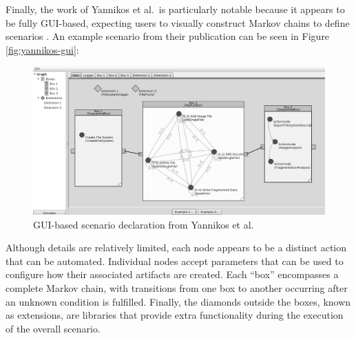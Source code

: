 \documentclass[letterpaper,12pt]{report}
\begin{document}
Finally, the work of Yannikos et al.~is particularly notable because it
appears to be fully GUI-based, expecting users to visually construct
Markov chains to define scenarios
\cite{yannikosDataCorporaDigital2014}. An example scenario from
their publication can be seen in Figure \autoref{fig:yannikos-gui}:

\begin{figure}[h]
\centering
\includegraphics[width=1\linewidth]{yannikos.png}
\caption{GUI-based scenario declaration from Yannikos et al.
\cite{yannikosDataCorporaDigital2014}}\label{fig:yannikos-gui}
\end{figure}

Although details are relatively limited, each node appears to be a
distinct action that can be automated. Individual nodes accept
parameters that can be used to configure how their associated artifacts
are created. Each ``box'' encompasses a complete Markov chain, with
transitions from one box to another occurring after an unknown condition
is fulfilled. Finally, the diamonds outside the boxes, known as
extensions, are libraries that provide extra functionality during the
execution of the overall scenario.
\end{document}
